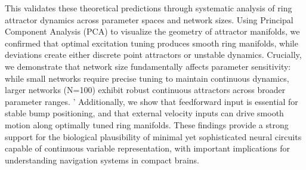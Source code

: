 \documentclass[11pt,a4paper]{article}
\begin{document}
This validates these theoretical predictions through systematic analysis of ring attractor dynamics across parameter spaces and network sizes. 
Using Principal Component Analysis (PCA) to visualize the geometry of attractor manifolds, we confirmed that optimal excitation tuning produces smooth ring manifolds, while deviations create either discrete point attractors or unstable dynamics. 
Crucially, we demonstrate that network size fundamentally affects parameter sensitivity: while small networks require precise tuning to maintain continuous dynamics, larger networks (N=100) exhibit robust continuous attractors across broader parameter ranges. '
Additionally, we show that feedforward input is essential for stable bump positioning, and that external velocity inputs can drive smooth motion along optimally tuned ring manifolds. 
These findings provide a strong support for the biological plausibility of minimal yet sophisticated neural circuits capable of continuous variable representation, with important implications for understanding navigation systems in compact brains.
\end{document}
